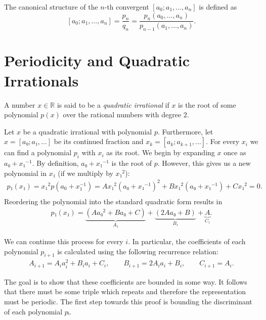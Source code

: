 \begin{definition}
  The canonical structure of the $n$-th convergent $[a_0; a_1, \dots, a_n]$ is defined as
  \[
    [a_0; a_1, \dots, a_n] = \frac{p_n}{q_n} = \frac{p_n(a_0, \dots, a_n)}{p_{n-1}(a_1, \dots, a_n)}.
  \]
\end{definition}

\section{Periodicity and Quadratic Irrationals}

\begin{definition}
  A number $x ∈ ℝ$ is said to be a \emph{quadratic irrational} if $x$ is the root of some
  polynomial $p(x)$ over the rational numbers with degree $2$.
\end{definition}

Let $x$ be a quadratic irrational with polynomial $p$.
Furthermore, let $x = [a₀; a₁, \dots]$ be its continued fraction and $x_k = [a_k; a_{k+1}, \dots]$.
For every $x_i$ we can find a polynomial $p_i$ with $x_i$ as its root.
We begin by expanding $x$ once as $a₀ + x₁^{-1}$.
By definition, $a₀ + x₁^{-1}$ is the root of $p$.
However, this gives us a new polynomial in $x₁$ (if we multiply by $x₁^2$):
\begin{align*}
  p₁(x₁) = x₁^2 p(a_0 + x_1^{-1}) = A x₁^2 (a₀ + x₁^{-1})^2 + B x₁^2 (a₀ + x₁^{-1}) + C x₁^2 = 0. \\
\end{align*}
Reordering the polynomial into the standard quadratic form results in
\begin{align*}
  p₁(x₁) = \underbrace{(A a₀^2 + B a₀ + C)}_{A₁} + \underbrace{(2A a₀ + B)}_{B₁} + \underbrace{A}_{C₁}.
\end{align*}

We can continue this process for every $i$.
In particular, the coefficients of each polynomial $p_{i+1}$ is calculated
using the following recurrence relation:
\begin{align*}
  A_{i+1} = A_i a_i^2 + B_i a_i + C_i, \qquad
  B_{i+1} = 2 A_i a_i + B_i, \qquad
  C_{i+1} = A_i.
\end{align*}

The goal is to show that these coefficients are bounded in some way.
It follows that there must be some triple which repeats and therefore the
representation must be periodic.
The first step towards this proof is bounding the discriminant of each
polynomial $pᵢ$.

